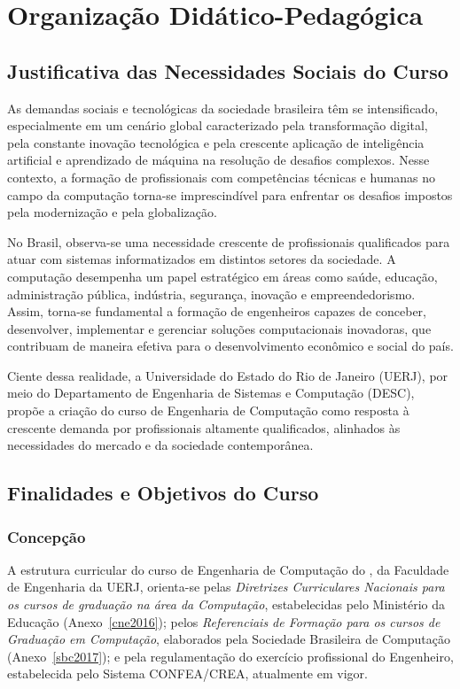 \chapter{Organização Didático-Pedagógica}

\section{Justificativa das Necessidades Sociais do Curso}

As demandas sociais e tecnológicas da sociedade brasileira têm se intensificado, especialmente em um cenário global caracterizado pela transformação digital, pela constante inovação tecnológica e pela crescente aplicação de inteligência artificial e aprendizado de máquina na resolução de desafios complexos. Nesse contexto, a formação de profissionais com competências técnicas e humanas no campo da computação torna-se imprescindível para enfrentar os desafios impostos pela modernização e pela globalização.

No Brasil, observa-se uma necessidade crescente de profissionais qualificados para atuar com sistemas informatizados em distintos setores da sociedade. A computação desempenha um papel estratégico em áreas como saúde, educação, administração pública, indústria, segurança, inovação e empreendedorismo. Assim, torna-se fundamental a formação de engenheiros capazes de conceber, desenvolver, implementar e gerenciar soluções computacionais inovadoras, que contribuam de maneira efetiva para o desenvolvimento econômico e social do país.

Ciente dessa realidade, a Universidade do Estado do Rio de Janeiro (UERJ), por meio do Departamento de Engenharia de Sistemas e Computação (DESC), propõe a criação do curso de Engenharia de Computação como resposta à crescente demanda por profissionais altamente qualificados, alinhados às necessidades do mercado e da sociedade contemporânea.

\section{Finalidades e Objetivos do Curso}

\subsection{Concepção}

A estrutura curricular do curso de Engenharia de Computação do \desc, da Faculdade de Engenharia da UERJ, orienta-se pelas \textit{Diretrizes Curriculares Nacionais para os cursos de graduação na área da Computação}, estabelecidas pelo Ministério da Educação (Anexo~\ref{cne2016}); pelos \textit{Referenciais de Formação para os cursos de Graduação em Computação}, elaborados pela Sociedade Brasileira de Computação (Anexo~\ref{sbc2017}); e pela regulamentação do exercício profissional do Engenheiro, estabelecida pelo Sistema CONFEA/CREA, atualmente em vigor.

